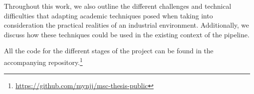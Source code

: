 Throughout this work, we also outline the different challenges and technical difficulties that adapting
academic techniques posed when taking into consideration the practical realities
of an industrial environment. Additionally, we discuss how these techniques could
be used in the existing context of the pipeline.

All the code for the different stages of the project can be found 
in the accompanying repository.\footnote{\url{https://github.com/mynjj/msc-thesis-public}}